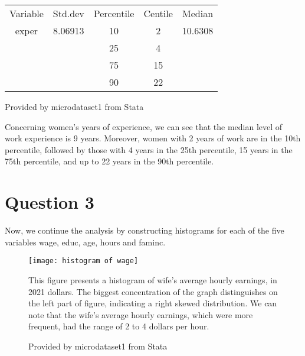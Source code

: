 \documentclass[10pt,towside,a4paper]{article}
\begin{document}
\begin{table}[H]
	\begin{Center}
		 \label{tab:title} 
		\begin{tabular}{|c|c|c|c|c|}
			\toprule
			Variable & Std.dev & Percentile & Centile 	&	Median 	 \\
			exper    & 8.06913 & 10 		& 2  		&	10.6308  \\
			&		 		   & 25  	    & 4    	    &  			\\                            
			&         		   & 75  		& 15    	&   		\\
			&         		   & 90  		& 22    	& 			\\
			\bottomrule
		\end{tabular} \par
		Provided by microdataset1 from Stata
	\end{Center}
	
	
	Concerning women’s years of experience, we can see that the median level of work experience is 9 years. Moreover, women with 2 years of work are in the 10th percentile, followed by those with 4 years in the 25th percentile, 15 years in the 75th percentile, and up to 22 years in the 90th percentile. 
\end{table}
	
	\newpage
	
	\section*{Question 3}
	Now, we continue the analysis by constructing histograms for each of the five variables wage, educ, age, hours and faminc.
	

\begin{figure}[H]
	\begin{Center}
	\texttt{[image: histogram of wage]}
	\caption{Provided by microdataset1 from Stata}
	\label{fig:histogram of wage}
	\end{Center}
	
	
	This figure presents a histogram of wife's average hourly earnings, in 2021 dollars. The biggest concentration of the graph distinguishes on the left part of figure, indicating a right skewed distribution. We can note that the wife's average hourly earnings, which were more frequent, had the range of 2 to 4 dollars per hour.
\end{figure}
	
\end{document}

